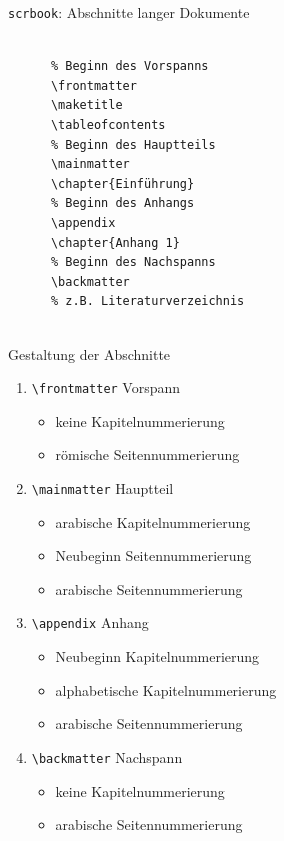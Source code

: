 \begin{Frame}[fragile]{\lstinline-scrbook-: Abschnitte langer Dokumente}
  \begin{lstlisting}[gobble=4]
    
      % Beginn des Vorspanns
      \frontmatter
      \maketitle
      \tableofcontents
      % Beginn des Hauptteils
      \mainmatter
      \chapter{Einführung}
      % Beginn des Anhangs
      \appendix
      \chapter{Anhang 1}
      % Beginn des Nachspanns
      \backmatter
      % z.B. Literaturverzeichnis
    
  \end{lstlisting}
\end{Frame}

\begin{Frame}[label=current,fragile]{Gestaltung der Abschnitte}
  \begin{enumerate}
    \item \lstinline-\frontmatter- Vorspann \begin{itemize}
        \item keine Kapitelnummerierung
        \item römische Seitennummerierung
      \end{itemize}
    \pause
    \item \lstinline-\mainmatter- Hauptteil \begin{itemize}
        \item arabische Kapitelnummerierung
        \item Neubeginn Seitennummerierung
        \item arabische Seitennummerierung
      \end{itemize}
    \pause
    \item \lstinline-\appendix- Anhang \begin{itemize}
        \item Neubeginn Kapitelnummerierung
        \item alphabetische Kapitelnummerierung
        \item arabische Seitennummerierung
      \end{itemize}
    \pause
    \item \lstinline-\backmatter- Nachspann \begin{itemize}
        \item keine Kapitelnummerierung
        \item arabische Seitennummerierung
      \end{itemize}
  \end{enumerate}
\end{Frame}

